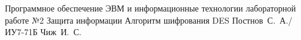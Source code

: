 \documentclass{bmstu}
\begin{document}
	
	{Программное обеспечение ЭВМ и информационные технологии}
	{лабораторной работе №2}
	{Защита информации}
	{Алгоритм шифрования DES}
	{}
	{Постнов~С.~А./ИУ7-71Б}
	{Чиж~И.~С.}
	
	\maketableofcontents
	
	
	
	
	
	
	
	\makebibliography
	
\end{document}
